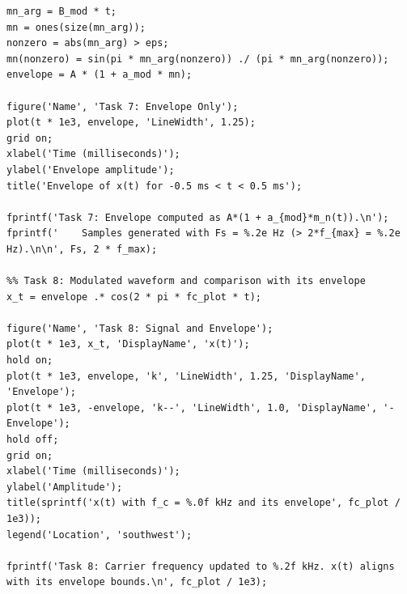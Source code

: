 \documentclass[12pt]{article}
\begin{document}
\begin{verbatim}
mn_arg = B_mod * t;
mn = ones(size(mn_arg));
nonzero = abs(mn_arg) > eps;
mn(nonzero) = sin(pi * mn_arg(nonzero)) ./ (pi * mn_arg(nonzero));
envelope = A * (1 + a_mod * mn);

figure('Name', 'Task 7: Envelope Only');
plot(t * 1e3, envelope, 'LineWidth', 1.25);
grid on;
xlabel('Time (milliseconds)');
ylabel('Envelope amplitude');
title('Envelope of x(t) for -0.5 ms < t < 0.5 ms');

fprintf('Task 7: Envelope computed as A*(1 + a_{mod}*m_n(t)).\n');
fprintf('    Samples generated with Fs = %.2e Hz (> 2*f_{max} = %.2e Hz).\n\n', Fs, 2 * f_max);

%% Task 8: Modulated waveform and comparison with its envelope
x_t = envelope .* cos(2 * pi * fc_plot * t);

figure('Name', 'Task 8: Signal and Envelope');
plot(t * 1e3, x_t, 'DisplayName', 'x(t)');
hold on;
plot(t * 1e3, envelope, 'k', 'LineWidth', 1.25, 'DisplayName', 'Envelope');
plot(t * 1e3, -envelope, 'k--', 'LineWidth', 1.0, 'DisplayName', '-Envelope');
hold off;
grid on;
xlabel('Time (milliseconds)');
ylabel('Amplitude');
title(sprintf('x(t) with f_c = %.0f kHz and its envelope', fc_plot / 1e3));
legend('Location', 'southwest');

fprintf('Task 8: Carrier frequency updated to %.2f kHz. x(t) aligns with its envelope bounds.\n', fc_plot / 1e3);
\end{verbatim}
\end{document}
